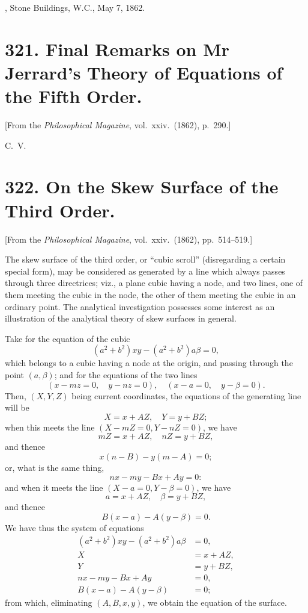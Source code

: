 \documentclass[11pt,a4paper]{article}
\theoremstyle{plain}
\begin{document}
\medskip
{}, Stone Buildings, W.C., May 7, 1862.


\newpage
\section*{321. Final Remarks on Mr Jerrard's Theory of Equations of the Fifth Order.}

[From the \textit{Philosophical Magazine}, vol.\ xxiv.\ (1862), p.\ 290.]

\medskip

\noindent C.\ V.


\newpage
\section*{322. On the Skew Surface of the Third Order.}

[From the \textit{Philosophical Magazine}, vol.\ xxiv.\ (1862), pp.\ 514--519.]

\medskip

The skew surface of the third order, or ``cubic scroll'' (disregarding a certain special form), may be considered as generated by a line which always passes through three directrices; viz., a plane cubic having a node, and two lines, one of them meeting the cubic in the node, the other of them meeting the cubic in an ordinary point. The analytical investigation possesses some interest as an illustration of the analytical theory of skew surfaces in general.

Take for the equation of the cubic
\[
(a^2 + b^2)xy - (a^2 + b^2)a\beta = 0,
\]
which belongs to a cubic having a node at the origin, and passing through the point $(a, \beta)$; and for the equations of the two lines
\[
(x - mz = 0, \quad y - nz = 0), \quad (x - a = 0, \quad y - \beta = 0).
\]
Then, $(X, Y, Z)$ being current coordinates, the equations of the generating line will be
\[
X = x + AZ, \quad Y = y + BZ;
\]
when this meets the line $(X - mZ = 0, Y - nZ = 0)$, we have
\[
mZ = x + AZ, \quad nZ = y + BZ,
\]
and thence
\[
x(n - B) - y(m - A) = 0;
\]
or, what is the same thing,
\[
nx - my - Bx + Ay = 0:
\]
and when it meets the line $(X - a = 0, Y - \beta = 0)$, we have
\[
a = x + AZ, \quad \beta = y + BZ,
\]
and thence
\[
B(x - a) - A(y - \beta) = 0.
\]
We have thus the system of equations
\begin{align*}
(a^2 + b^2)xy - (a^2 + b^2)a\beta &= 0, \\
X &= x + AZ, \\
Y &= y + BZ, \\
nx - my - Bx + Ay &= 0, \\
B(x - a) - A(y - \beta) &= 0;
\end{align*}
from which, eliminating $(A, B, x, y)$, we obtain the equation of the surface.
\end{document}
